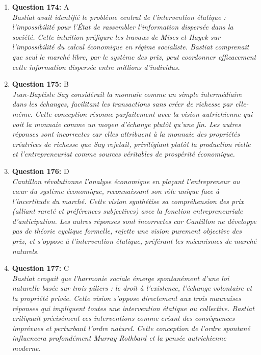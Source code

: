 \documentclass[12pt,a4paper]{article}
\begin{document}
\begin{enumerate}
\item \textbf{Question 174:} A
\\ \textit{Bastiat avait identifié le problème central de l'intervention étatique : l'impossibilité pour l'État de rassembler l'information dispersée dans la société. Cette intuition préfigure les travaux de Mises et Hayek sur l'impossibilité du calcul économique en régime socialiste. Bastiat comprenait que seul le marché libre, par le système des prix, peut coordonner efficacement cette information dispersée entre millions d'individus.}

\item \textbf{Question 175:} B
\\ \textit{Jean-Baptiste Say considérait la monnaie comme un simple intermédiaire dans les échanges, facilitant les transactions sans créer de richesse par elle-même. Cette conception résonne parfaitement avec la vision autrichienne qui voit la monnaie comme un moyen d'échange plutôt qu'une fin. Les autres réponses sont incorrectes car elles attribuent à la monnaie des propriétés créatrices de richesse que Say rejetait, privilégiant plutôt la production réelle et l'entrepreneuriat comme sources véritables de prospérité économique.}

\item \textbf{Question 176:} D
\\ \textit{Cantillon révolutionne l'analyse économique en plaçant l'entrepreneur au cœur du système économique, reconnaissant son rôle unique face à l'incertitude du marché. Cette vision synthétise sa compréhension des prix (alliant rareté et préférences subjectives) avec la fonction entrepreneuriale d'anticipation. Les autres réponses sont incorrectes car Cantillon ne développe pas de théorie cyclique formelle, rejette une vision purement objective des prix, et s'oppose à l'intervention étatique, préférant les mécanismes de marché naturels.}

\item \textbf{Question 177:} C
\\ \textit{Bastiat croyait que l'harmonie sociale émerge spontanément d'une loi naturelle basée sur trois piliers : le droit à l'existence, l'échange volontaire et la propriété privée. Cette vision s'oppose directement aux trois mauvaises réponses qui impliquent toutes une intervention étatique ou collective. Bastiat critiquait précisément ces interventions comme créant des conséquences imprévues et perturbant l'ordre naturel. Cette conception de l'ordre spontané influencera profondément Murray Rothbard et la pensée autrichienne moderne.}


\end{enumerate}
\end{document}
